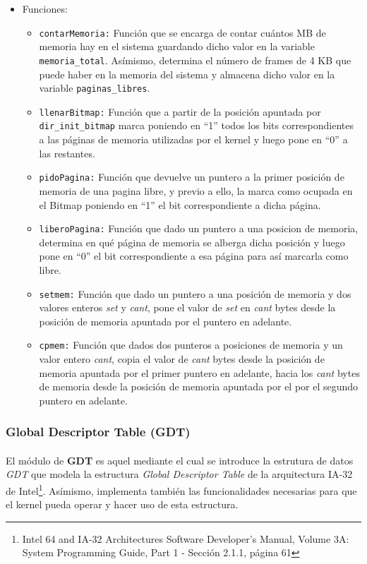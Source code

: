 \documentclass[11pt, a4paper]{article}
\begin{document}
\begin{itemize}
				\item Funciones:
				\begin{itemize}
					\item \texttt{contarMemoria:} Función que se encarga de contar cuántos MB de memoria hay en el sistema guardando dicho valor en la variable \texttt{memoria\_total}. Asímismo, determina el número de frames de 4 KB que puede haber en la memoria del sistema y almacena dicho valor en la variable \texttt{paginas\_libres}.
					\item \texttt{llenarBitmap:} Función que a partir de la posición apuntada por \texttt{dir\_init\_bitmap} marca poniendo en ``1'' todos los bits correspondientes a las páginas de memoria utilizadas por el kernel y luego pone en ``0'' a las restantes.
					\item \texttt{pidoPagina:} Función que devuelve un puntero a la primer posición de memoria de una pagina libre, y previo a ello, la marca como ocupada en el Bitmap poniendo en ``1'' el bit correspondiente a dicha página.
					\item \texttt{liberoPagina:} Función que dado un puntero a una posicion de memoria, determina en qué página de memoria se alberga dicha posición y luego pone en ``0'' el bit correspondiente a esa página para así marcarla como libre.
					\item \texttt{setmem:} Función que dado un puntero a una posición de memoria y dos valores enteros \textit{set} y \textit{cant}, pone el valor de \textit{set} en \textit{cant} bytes desde la posición de memoria apuntada por el puntero en adelante.
					\item \texttt{cpmem:} Función que dados dos punteros a posiciones de memoria y un valor entero \textit{cant}, copia el valor de \textit{cant} bytes desde la posición de memoria apuntada por el primer puntero en adelante, hacia los \textit{cant} bytes de memoria desde la posición de memoria apuntada por el por el segundo puntero en adelante.
				\end{itemize}
			\end{itemize}

		\subsubsection{Global Descriptor Table (GDT)}
			\paragraph{}
			El módulo de \textbf{GDT} es aquel mediante el cual se introduce la estrutura de datos \textit{GDT} que modela la estructura \textit{Global Descriptor Table} de la arquitectura IA-32 de Intel\footnote{Intel 64 and IA-32 Architectures Software Developer’s Manual, Volume 3A: System Programming Guide, Part 1 - Sección 2.1.1, página 61}. Asímismo, implementa también las funcionalidades necesarias para que el kernel pueda operar y hacer uso de esta estructura.
			
\end{document}
